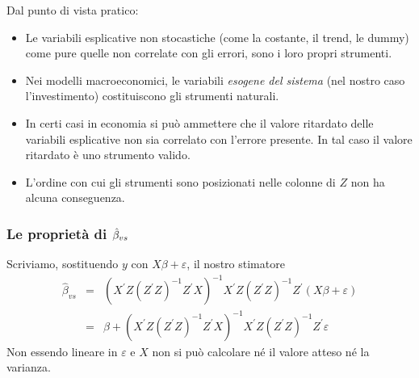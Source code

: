 \documentclass[a4paper]{report}
\newcounter{ese}
\theoremstyle{remark}
\begin{document}
\noindent Dal punto di vista pratico:

\begin{itemize}
\item Le variabili esplicative non stocastiche (come la costante, il trend,
le dummy) come pure quelle non correlate con gli errori, sono i loro propri
strumenti.

\item Nei modelli macroeconomici, le variabili \emph{esogene del sistema}
(nel nostro caso l'investimento) costituiscono gli strumenti naturali.

\item In certi casi in economia si pu\`{o} ammettere che il valore ritardato
delle variabili esplicative non sia correlato con l'errore presente. In tal
caso il valore ritardato \`{e} uno strumento valido.

\item L'ordine con cui gli strumenti sono posizionati nelle colonne di $Z$
non ha alcuna conseguenza.
\end{itemize}

\subsubsection{{Le propriet\`{a} di $\hat{\protect\beta}_{vs}$}}

Scriviamo, sostituendo $y$ con $X\beta +\varepsilon $, il nostro stimatore 
\begin{eqnarray*}
\widehat{\beta }_{vs} &=&\left( X^{\prime }Z(Z^{\prime }Z)^{-1}Z^{\prime
}X\right) ^{-1}X^{\prime }Z(Z^{\prime }Z)^{-1}Z^{\prime }(X\beta
+\varepsilon ) \\
&=&\beta +\left( X^{\prime }Z(Z^{\prime }Z)^{-1}Z^{\prime }X\right)
^{-1}X^{\prime }Z(Z^{\prime }Z)^{-1}Z^{\prime }\varepsilon
\end{eqnarray*}%
Non essendo lineare in $\varepsilon $ e $X$ non si pu\`{o} calcolare n\'{e}
il valore atteso n\'{e} la varianza.
\end{document}
